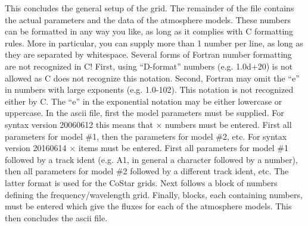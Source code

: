 This concludes the general setup of the grid. The remainder of the file
contains the actual parameters and the data of the atmosphere models. These
numbers can be formatted in any way you like, as long as it complies with C
formatting rules. More in particular, you can supply more than 1 number per
line, as long as they are separated by whitespace. Several forms of Fortran
number formatting are not recognized in C! First, using ``D-format'' numbers
(e.g. 1.0d+20) is not allowed as C does not recognize this notation. Second,
Fortran may omit the ``e'' in numbers with large exponents (e.g. 1.0-102).
This notation is not recognized either by C. The ``e'' in the exponential
notation may be either lowercase or uppercase. In the ascii file, first the
model parameters must be supplied. For syntax version 20060612 this means
that  $\times$  numbers must be entered.
First all parameters for model \#1, then the parameters for model \#2, etc.
For syntax version 20160614  $\times$ 
items must be entered. First all parameters for model \#1 followed by
a track ident (e.g. A1, in general a character followed by a number), then
all parameters for model \#2 followed by a different track ident, etc.
The latter format is used for the CoStar grids. Next follows a block of
 numbers defining the frequency/wavelength grid. Finally,
 blocks, each containing  numbers, must be
entered which give the fluxes for each of the atmosphere models. This then
concludes the ascii file.

